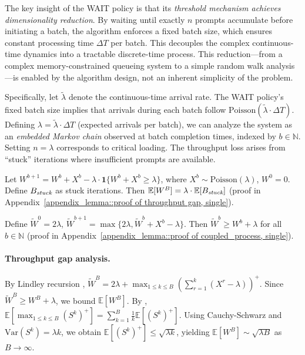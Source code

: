 The key insight of the WAIT policy is that its \emph{threshold mechanism achieves dimensionality reduction}. By waiting until exactly $n$ prompts accumulate before initiating a batch, the algorithm enforces a fixed batch size, which ensures constant processing time $\Delta T$ per batch. This decouples the complex continuous-time dynamics into a tractable discrete-time process. This reduction---from a complex memory-constrained queueing system to a simple random walk analysis---is enabled by the algorithm design, not an inherent simplicity of the problem.

Specifically, let $\tilde{\lambda}$ denote the continuous-time arrival rate. The WAIT policy's fixed batch size implies that arrivals during each batch follow $\text{Poisson}(\tilde{\lambda} \cdot \Delta T)$. Defining $\lambda = \tilde{\lambda} \cdot \Delta T$ (expected arrivals per batch), we can analyze the system as an \emph{embedded Markov chain} observed at batch completion times, indexed by $b \in \mathbb{N}$. Setting $n = \lambda$ corresponds to critical loading. The throughput loss arises from ``stuck'' iterations where insufficient prompts are available.

\begin{lemma}\label{lemma::throughput gap, single}
Let $W^{b+1}=W^b+X^b-\lambda\cdot \mathbf{1}\{W^b+X^b\geq \lambda\}$, where $X^b \sim \text{Poisson}(\lambda)$, $W^0=0$. Define $B_{\emph{stuck}}$ as stuck iterations. Then $\mathbb{E}[W^B]= \lambda\cdot\mathbb{E}[B_{\emph{stuck}}]$ (proof in Appendix~\ref{appendix_lemma::proof of throughput gap, single}).
\end{lemma}

\begin{lemma}\label{lem:coupled_process, single}
Define $\tilde{W}^0 = 2\lambda$, $\tilde{W}^{b+1} = \max\{ 2\lambda, \tilde{W}^b + X^b - \lambda \}$. Then $\tilde{W}^b \geq W^b + \lambda$ for all $b\in \mathbb{N}$ (proof in Appendix~\ref{appendix_lemma::proof of coupled_process, single}).
\end{lemma}

\paragraph{Throughput gap analysis.} By Lindley recursion \citep[Proposition 6.3]{asmussen2003applied}, $\tilde{W}^B=2\lambda+\max_{1\leq k\leq B}(\sum_{r=1}^{k}(X^r-\lambda))^+$. Since $\tilde{W}^B \geq W^B + \lambda$, we bound $\mathbb{E}[W^B]$. By \cite{strait1974maximum}, $\mathbb{E}[\max_{1\leq k\leq B}(S^k)^+]=\sum_{k=1}^B \frac{1}{k}\mathbb{E}[(S^k)^+]$. Using Cauchy-Schwarz and $\text{Var}(S^k) = \lambda k$, we obtain $\mathbb{E}[(S^k)^+] \leq \sqrt{\lambda k}$, yielding $\mathbb{E}[W^B] \sim \sqrt{\lambda B}$ as $B \to \infty$.

